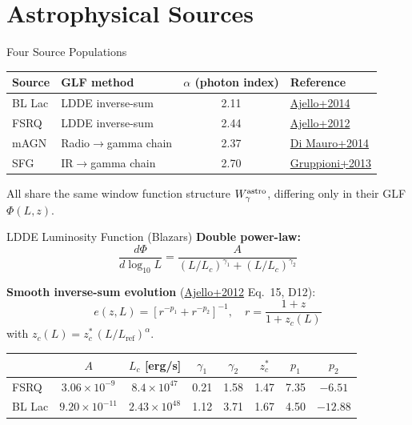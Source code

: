 \section{Astrophysical Sources}

\begin{frame}{Four Source Populations}
\begin{table}\centering\footnotesize
\begin{tabular}{llcl}
\toprule
Source & GLF method & $\alpha$ (photon index) & Reference \\
\midrule
BL Lac & LDDE inverse-sum & 2.11 & \href{https://arxiv.org/abs/1310.0006}{Ajello+2014} \\
FSRQ & LDDE inverse-sum & 2.44 & \href{https://arxiv.org/abs/1110.3787}{Ajello+2012} \\
mAGN & Radio$\to$gamma chain & 2.37 & \href{https://arxiv.org/abs/1304.0908}{Di Mauro+2014} \\
SFG & IR$\to$gamma chain & 2.70 & \href{https://arxiv.org/abs/1302.5209}{Gruppioni+2013} \\
\bottomrule
\end{tabular}
\end{table}

\vspace{0.3cm}
All share the same window function structure $W_\gamma^{\mathrm{astro}}$, differing only in their GLF $\Phi(L,z)$.
\end{frame}

\begin{frame}{LDDE Luminosity Function (Blazars)}
\textbf{Double power-law:}
\begin{equation}
\frac{d\Phi}{d\log_{10}L} = \frac{A}{(L/L_c)^{\gamma_1} + (L/L_c)^{\gamma_2}}
\end{equation}

\textbf{Smooth inverse-sum evolution} (\href{https://arxiv.org/abs/1110.3787}{Ajello+2012} Eq.~15, D12):
\begin{equation}
e(z,L) = \left[r^{-p_1} + r^{-p_2}\right]^{-1}, \quad r = \frac{1+z}{1+z_c(L)}
\end{equation}
with $z_c(L) = z_c^*\,(L/L_{\mathrm{ref}})^\alpha$.

\vspace{0.2cm}
\begin{table}\centering\scriptsize
\begin{tabular}{lccccccc}
\toprule
& $A$ & $L_c$ [erg/s] & $\gamma_1$ & $\gamma_2$ & $z_c^*$ & $p_1$ & $p_2$ \\
\midrule
FSRQ & $3.06{\times}10^{-9}$ & $8.4{\times}10^{47}$ & 0.21 & 1.58 & 1.47 & 7.35 & $-6.51$ \\
BL Lac & $9.20{\times}10^{-11}$ & $2.43{\times}10^{48}$ & 1.12 & 3.71 & 1.67 & 4.50 & $-12.88$ \\
\bottomrule
\end{tabular}
\end{table}
\end{frame}

